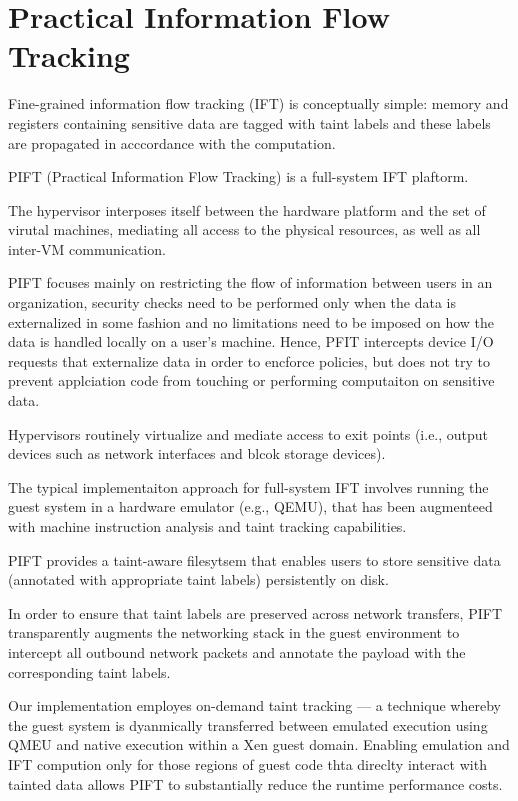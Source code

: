 \section{Practical Information Flow Tracking}


Fine-grained information flow tracking (IFT) is conceptually simple: memory and
registers containing sensitive data are tagged with taint labels and these
labels are propagated in acccordance with the computation.

PIFT (Practical Information Flow Tracking) is a full-system IFT plaftorm.

The hypervisor interposes itself between the hardware platform and the set of
virutal machines, mediating all access to the physical resources, as well as
all inter-VM communication.

PIFT focuses mainly on restricting the flow of information between users in an
organization, security checks need to be performed only when the data is
externalized in some fashion and no limitations need to be imposed on how the
data is handled locally on a user's machine.  
%
Hence, PFIT intercepts device I/O requests that externalize data in order to
encforce policies, but does not try to prevent applciation code from touching
or performing computaiton on sensitive data.

Hypervisors routinely virtualize and mediate access to exit points (i.e.,
output devices such as network interfaces and blcok storage devices).

The typical implementaiton approach for full-system IFT involves running the
guest system in a hardware emulator (e.g., QEMU), that has been augmenteed
with machine instruction analysis and taint tracking capabilities.

PIFT provides a taint-aware filesytsem that enables users to store sensitive data
(annotated with appropriate taint labels) persistently on disk.


In order to ensure that taint labels are preserved across network transfers,
PIFT transparently augments the networking stack in the guest environment to
intercept all outbound network packets and annotate the payload with the
corresponding taint labels.


Our implementation employes on-demand taint tracking --- a technique whereby
the guest system is dyanmically transferred between emulated execution using
QMEU and native execution within a Xen guest domain. Enabling emulation and IFT
compution only for those regions of guest code thta direclty interact with
tainted data allows PIFT to substantially reduce the runtime performance costs.


